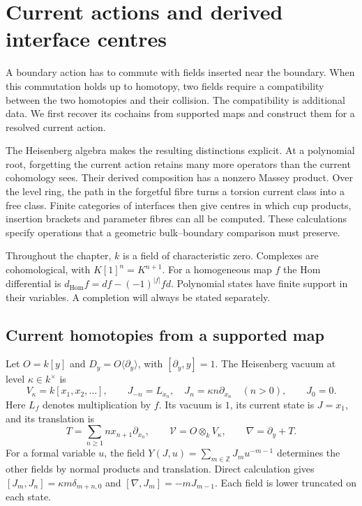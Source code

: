 \chapter{Current actions and derived interface centres}
\label{ch:vol2-currents}

A boundary action has to commute with fields inserted near the boundary.
When this commutation holds up to homotopy, two fields require a
compatibility between the two homotopies and their collision. The
compatibility is additional data. We first recover its cochains from
supported maps and construct them for a resolved current action.

The Heisenberg algebra makes the resulting distinctions explicit. At a
polynomial root, forgetting the current action retains many more
operators than the current cohomology sees. Their derived composition
has a nonzero Massey product. Over the level ring, the path in the
forgetful fibre turns a torsion current class into a free class. Finite
categories of interfaces then give centres in which cup products,
insertion brackets and parameter fibres can all be computed. These
calculations specify operations that a geometric bulk--boundary
comparison must preserve.

Throughout the chapter, $k$ is a field of characteristic zero. Complexes
are cohomological, with $K[1]^n=K^{n+1}$. For a homogeneous map $f$ the
Hom differential is $d_{\mathrm{Hom}}f=d f-(-1)^{|f|}f d$.
Polynomial states have finite support in their variables. A completion
will always be stated separately.

\section{Current homotopies from a supported map}
\label{sec:vol2-current-homotopies}

Let $O=k[y]$ and $D_y=O\langle\partial_y\rangle$, with
$[\partial_y,y]=1$. The Heisenberg vacuum at level $\kappa\in k^\times$
is
\begin{equation}\label{eq:vol2-fock-currents}
 V_\kappa=k[x_1,x_2,\ldots],\qquad
 J_{-n}=L_{x_n},\quad J_n=\kappa n\partial_{x_n}\quad(n>0),
 \qquad J_0=0.
\end{equation}
Here $L_f$ denotes multiplication by $f$. Its vacuum is $1$, its
current state is $J=x_1$, and its translation is
\[
 T=\sum_{n\geq1}n x_{n+1}\partial_{x_n},\qquad
 \mathcal V=O\otimes_kV_\kappa,\qquad \nabla=\partial_y+T.
\]
For a formal variable $u$, the field
$Y(J,u)=\sum_{m\in\mathbb Z}J_m u^{-m-1}$ determines the other
fields by normal products and translation. Direct calculation
gives $[J_m,J_n]=\kappa m\delta_{m+n,0}$ and
$[\nabla,J_m]=-mJ_{m-1}$. Each field is lower truncated on each state.

